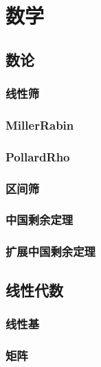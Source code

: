 \section{数学}
\subsection{数论}
\subsubsection{线性筛}

\subsubsection{MillerRabin}


\subsubsection{PollardRho}


\subsubsection{区间筛}


\subsubsection{中国剩余定理}

\subsubsection{扩展中国剩余定理}

\subsection{线性代数}
\subsubsection{线性基}

\subsubsection{矩阵}

